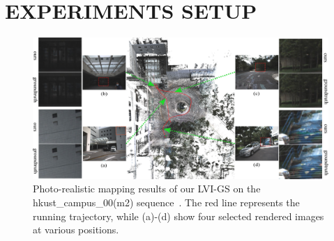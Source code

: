 \documentclass[lettersize,journal]{IEEEtran}
\begin{document}
\section{EXPERIMENTS SETUP}
\begin{figure}[ht]  %
        \captionsetup{justification=justified, labelsep=colon}%
        \centering
        \includegraphics[width=2.0\columnwidth]{image/fullseq/fullseq.pdf}
        \caption{
        Photo-realistic mapping results of our LVI-GS on the hkust_campus_00(m2) sequence~\cite{r3live}.
        The red line represents the running trajectory, while (a)-(d) show four selected rendered images at various positions.
        }
        \label{fig:fullseq}
\end{figure}%
\end{document}
